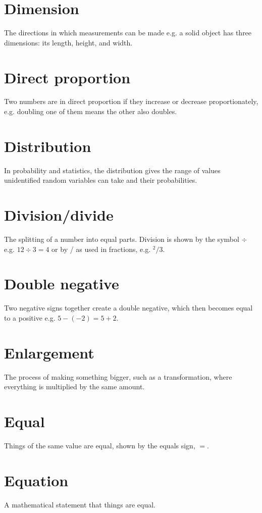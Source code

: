 \documentclass[10pt]{article}
\begin{document}
\section*{Dimension}
The directions in which measurements can be made e.g. a solid object has three dimensions: its length, height, and width.

\section*{Direct proportion}
Two numbers are in direct proportion if they increase or decrease proportionately, e.g. doubling one of them means the other also doubles.

\section*{Distribution}
In probability and statistics, the distribution gives the range of values unidentified random variables can take and their probabilities.

\section*{Division/divide}
The splitting of a number into equal parts. Division is shown by the symbol $\div$ e.g. $12 \div 3=4$ or by / as used in fractions, e.g. ${ }^{2} / 3$.

\section*{Double negative}
Two negative signs together create a double negative, which then becomes equal to a positive e.g. $5-(-2)=5+2$.

\section*{Enlargement}
The process of making something bigger, such as a transformation, where everything is multiplied by the same amount.

\section*{Equal}
Things of the same value are equal, shown by the equals sign, $=$.

\section*{Equation}
A mathematical statement that things are equal.
\end{document}
